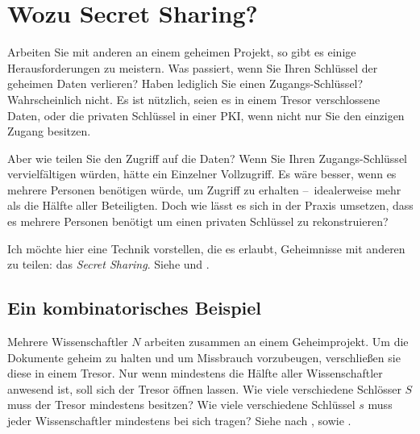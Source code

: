 \documentclass[12pt, a4paper, oneside, titlepage]{report}
\theoremstyle{definition}
\begin{document}
	\section{Wozu Secret Sharing?}
	Arbeiten Sie mit anderen an einem geheimen Projekt, so gibt es einige Herausforderungen zu meistern. Was passiert, wenn Sie Ihren Schlüssel der geheimen Daten verlieren? Haben lediglich Sie einen Zugangs-Schlüssel? Wahrscheinlich nicht. Es ist nützlich, seien es in einem Tresor verschlossene Daten, oder die privaten Schlüssel in einer PKI, wenn nicht nur Sie den einzigen Zugang besitzen.
	
	Aber wie teilen Sie den Zugriff auf die Daten? Wenn Sie Ihren Zugangs-Schlüssel vervielfältigen würden, hätte ein Einzelner Vollzugriff. Es wäre besser, wenn es mehrere Personen benötigen würde, um Zugriff zu erhalten -- idealerweise mehr als die Hälfte aller Beteiligten. Doch wie lässt es sich in der Praxis umsetzen, dass es mehrere Personen benötigt um einen privaten Schlüssel zu rekonstruieren?
	
	Ich möchte hier eine Technik vorstellen, die es erlaubt, Geheimnisse mit anderen zu teilen: das \emph{Secret Sharing}. Siehe \cite{buchmann} und \cite{shamir}.
	
	
	\subsection{Ein kombinatorisches Beispiel}
	
	Mehrere Wissenschaftler $ N $ arbeiten zusammen an einem Geheimprojekt. Um die Dokumente geheim zu halten und um Missbrauch vorzubeugen, verschließen sie diese in einem Tresor. Nur wenn mindestens die Hälfte aller Wissenschaftler anwesend ist, soll sich der Tresor öffnen lassen. Wie viele verschiedene Schlösser $ S $ muss der Tresor mindestens besitzen? Wie viele verschiedene Schlüssel $ s $ muss jeder Wissenschaftler mindestens bei sich tragen? Siehe \cite{shamir} nach \cite{liu}, sowie \cite{quantum}.
	
\end{document}
